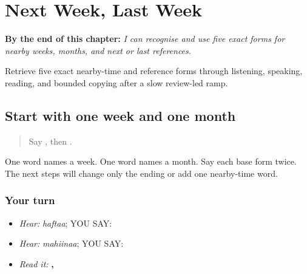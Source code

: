 
\chapter{Next Week, Last Week}
\label{ch:pa-a2-nearby-time}

\begin{chapteropening}
\textbf{By the end of this chapter:} \emph{I can recognise and use five exact forms for nearby weeks, months, and next or last references.}

Retrieve five exact nearby-time and reference forms through listening, speaking, reading, and bounded copying after a slow review-led ramp.
\end{chapteropening}

\section[(week and month review)]{Start with one week and one month}

\label{lesson:PA-C184-time-return}



\begin{quote}
Say \textbf{}, then \textbf{}.
\end{quote}

\begin{grammarlens}[title={Grammar Lens: keep the two time ideas steady}]
One word names a week. One word names a month. Say each base form twice. The next steps will change only the ending or add one nearby-time word.
\end{grammarlens}

\subsection*{Your turn}
\begin{itemize}
\raggedright
  \item \emph{Hear:} \emph{haftaa}; YOU SAY: \textbf{}
  \item \emph{Hear:} \emph{mahiinaa}; YOU SAY: \textbf{}
  \item \emph{Read it:} \textbf{, }
\end{itemize}

